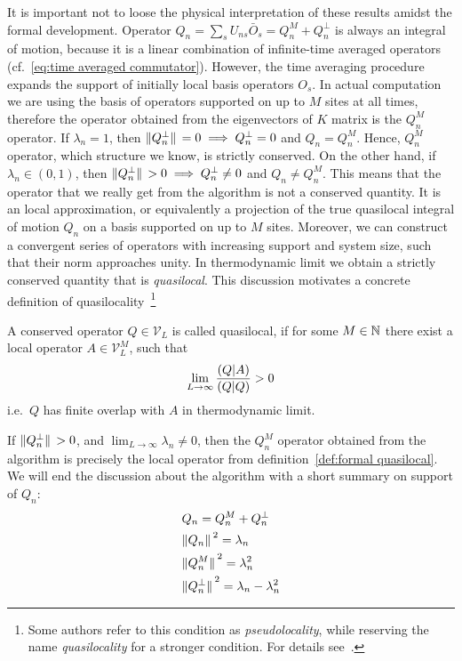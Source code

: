 It is important not to loose the physical interpretation of these results amidst the formal development.
Operator \(Q_n = \sum_s U_{ns}\bar{O}_{s} = Q_n^M + Q_n^{\perp} \) is always an integral of motion, 
because it is a linear combination of infinite-time averaged operators (cf.~\eqref{eq:time averaged commutator}).
However, the time averaging procedure expands the support of initially local basis operators \(O_s\).
In actual computation we are using the basis of operators supported on up to \(M\) sites at all times, therefore the operator
obtained from the eigenvectors of \(K\) matrix is the \(Q_n^M\) operator. If \(\lambda_n = 1\), then
\(\norm*{Q_n^{\perp}} = 0 \implies Q_n^{\perp} = 0\) and \(Q_n = Q_n^M\). Hence, \(Q_n^M\) operator, which
structure we know, is strictly conserved. On the other hand, if \(\lambda_n \in (0,1) \), then
\(\norm*{Q_n^{\perp}} > 0 \implies Q_n^{\perp} \neq 0\) and \(Q_n \neq Q_n^M\). This means that the operator
that we really get from the algorithm is not a conserved quantity. It is an local approximation, or equivalently
a projection of the true quasilocal integral of motion \(Q_n\) on a basis supported on up to \(M\) sites. Moreover, we can 
construct a convergent series of operators with increasing support and system size, such that their
norm approaches unity. In thermodynamic limit we obtain a strictly conserved
quantity that is \textit{quasilocal}. This discussion motivates a concrete definition
of quasilocality~\footnote{Some authors refer to this condition as \textit{pseudolocality},
while reserving the name \textit{quasilocality} for a stronger condition. For details
see~\textcite{Ilievski2016a}.}~\autocite{Mierzejewski2020b}
\begin{definition}[Quasilocality]
A conserved operator \(Q\in \mathcal{V}_L\) is called quasilocal, if for some \(M\in \mathbb{N}\)
there exist a local operator \(A \in \mathcal{V}_L^M \), such that
\begin{equation*}
  \lim_{L\to \infty} \frac{\left(Q \middle| A\right)}{\left(Q \middle| Q\right)} > 0
\end{equation*}
i.e.\ \(Q\) has finite overlap with \(A\) in thermodynamic limit.
  \label{def:formal quasilocal}
\end{definition}
If \(\norm*{Q_n^{\perp}} > 0\), and \(\lim_{L\to \infty} \lambda_n \neq 0\),
then the \(Q_n^M\) operator obtained from the algorithm is precisely the local operator from
definition~\ref{def:formal quasilocal}.
We will end the discussion about the algorithm with 
a short summary on support of \(Q_n\):
\begin{align}
  & Q_n = Q_n^M + Q_n^{\perp}\nonumber\\
  & \norm*{Q_n}^2 = \lambda_n \nonumber\\
  & \norm*{Q_n^M}^2 = \lambda_n^2 \nonumber\\
  & \norm*{Q_n^{\perp}}^2 = \lambda_n - \lambda_n^2
  \label{eq:summary of support}
\end{align}

